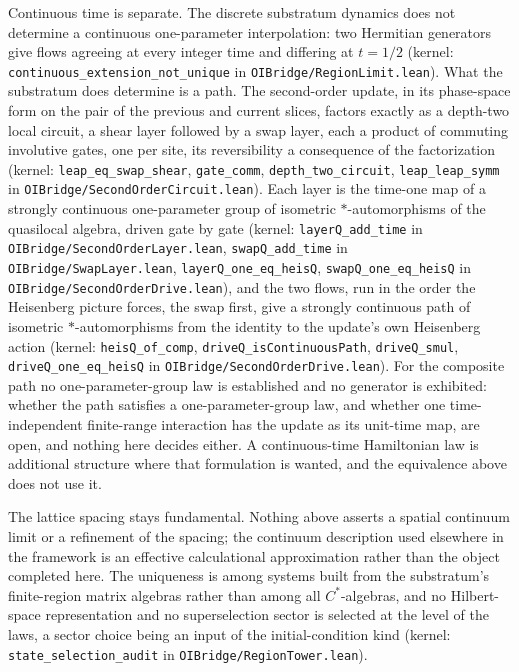 \documentclass[
]{article}
\begin{document}
Continuous time is separate. The discrete substratum dynamics does not
determine a continuous one-parameter interpolation: two Hermitian
generators give flows agreeing at every integer time and differing at
\(t = 1/2\) (kernel: \texttt{continuous\_extension\_not\_unique} in
\texttt{OIBridge/RegionLimit.lean}). What the substratum does determine
is a path. The second-order update, in its phase-space form on the pair
of the previous and current slices, factors exactly as a depth-two local
circuit, a shear layer followed by a swap layer, each a product of
commuting involutive gates, one per site, its reversibility a
consequence of the factorization (kernel:
\texttt{leap\_eq\_swap\_shear}, \texttt{gate\_comm},
\texttt{depth\_two\_circuit}, \texttt{leap\_leap\_symm} in
\texttt{OIBridge/SecondOrderCircuit.lean}). Each layer is the time-one
map of a strongly continuous one-parameter group of isometric
\(*\)-automorphisms of the quasilocal algebra, driven gate by gate
(kernel: \texttt{layerQ\_add\_time} in
\texttt{OIBridge/SecondOrderLayer.lean}, \texttt{swapQ\_add\_time} in
\texttt{OIBridge/SwapLayer.lean}, \texttt{layerQ\_one\_eq\_heisQ},
\texttt{swapQ\_one\_eq\_heisQ} in
\texttt{OIBridge/SecondOrderDrive.lean}), and the two flows, run in the
order the Heisenberg picture forces, the swap first, give a strongly
continuous path of isometric \(*\)-automorphisms from the identity to
the update's own Heisenberg action (kernel: \texttt{heisQ\_of\_comp},
\texttt{driveQ\_isContinuousPath}, \texttt{driveQ\_smul},
\texttt{driveQ\_one\_eq\_heisQ} in
\texttt{OIBridge/SecondOrderDrive.lean}). For the composite path no
one-parameter-group law is established and no generator is exhibited:
whether the path satisfies a one-parameter-group law, and whether one
time-independent finite-range interaction has the update as its
unit-time map, are open, and nothing here decides either. A
continuous-time Hamiltonian law is additional structure where that
formulation is wanted, and the equivalence above does not use it.

The lattice spacing stays fundamental. Nothing above asserts a spatial
continuum limit or a refinement of the spacing; the continuum
description used elsewhere in the framework is an effective
calculational approximation rather than the object completed here. The
uniqueness is among systems built from the substratum's finite-region
matrix algebras rather than among all \(C^{*}\)-algebras, and no
Hilbert-space representation and no superselection sector is selected at
the level of the laws, a sector choice being an input of the
initial-condition kind (kernel: \texttt{state\_selection\_audit} in
\texttt{OIBridge/RegionTower.lean}).
\end{document}

